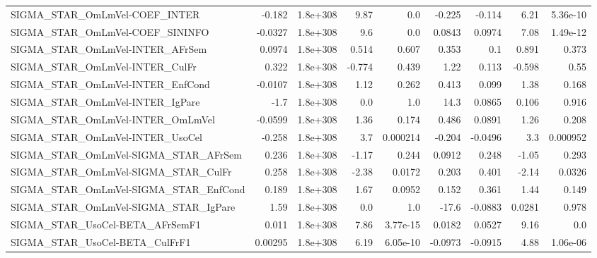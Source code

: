 \begin{tabular}{lrrrrrrrr}
SIGMA\_STAR\_OmLmVel-COEF\_INTER         &      -0.182 &     1.8e+308 &    9.87 &      0.0 &     -0.225 &      -0.114 &         6.21 &      5.36e-10 \\
SIGMA\_STAR\_OmLmVel-COEF\_SININFO       &     -0.0327 &     1.8e+308 &     9.6 &      0.0 &     0.0843 &      0.0974 &         7.08 &      1.49e-12 \\
SIGMA\_STAR\_OmLmVel-INTER\_AFrSem       &      0.0974 &     1.8e+308 &   0.514 &    0.607 &      0.353 &         0.1 &        0.891 &         0.373 \\
SIGMA\_STAR\_OmLmVel-INTER\_CulFr        &       0.322 &     1.8e+308 &  -0.774 &    0.439 &       1.22 &       0.113 &       -0.598 &          0.55 \\
SIGMA\_STAR\_OmLmVel-INTER\_EnfCond      &     -0.0107 &     1.8e+308 &    1.12 &    0.262 &      0.413 &       0.099 &         1.38 &         0.168 \\
SIGMA\_STAR\_OmLmVel-INTER\_IgPare       &        -1.7 &     1.8e+308 &     0.0 &      1.0 &       14.3 &      0.0865 &        0.106 &         0.916 \\
SIGMA\_STAR\_OmLmVel-INTER\_OmLmVel      &     -0.0599 &     1.8e+308 &    1.36 &    0.174 &      0.486 &      0.0891 &         1.26 &         0.208 \\
SIGMA\_STAR\_OmLmVel-INTER\_UsoCel       &      -0.258 &     1.8e+308 &     3.7 & 0.000214 &     -0.204 &     -0.0496 &          3.3 &      0.000952 \\
SIGMA\_STAR\_OmLmVel-SIGMA\_STAR\_AFrSem  &       0.236 &     1.8e+308 &   -1.17 &    0.244 &     0.0912 &       0.248 &        -1.05 &         0.293 \\
SIGMA\_STAR\_OmLmVel-SIGMA\_STAR\_CulFr   &       0.258 &     1.8e+308 &   -2.38 &   0.0172 &      0.203 &       0.401 &        -2.14 &        0.0326 \\
SIGMA\_STAR\_OmLmVel-SIGMA\_STAR\_EnfCond &       0.189 &     1.8e+308 &    1.67 &   0.0952 &      0.152 &       0.361 &         1.44 &         0.149 \\
SIGMA\_STAR\_OmLmVel-SIGMA\_STAR\_IgPare  &        1.59 &     1.8e+308 &     0.0 &      1.0 &      -17.6 &     -0.0883 &       0.0281 &         0.978 \\
SIGMA\_STAR\_UsoCel-BETA\_AFrSemF1       &       0.011 &     1.8e+308 &    7.86 & 3.77e-15 &     0.0182 &      0.0527 &         9.16 &           0.0 \\
SIGMA\_STAR\_UsoCel-BETA\_CulFrF1        &     0.00295 &     1.8e+308 &    6.19 & 6.05e-10 &    -0.0973 &     -0.0915 &         4.88 &      1.06e-06 \\

\end{tabular}
